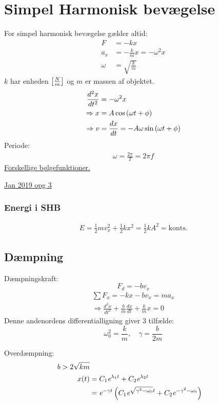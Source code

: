 \documentclass[a4paper,oneside,article]{memoir}
\begin{document}
\section{Simpel Harmonisk bevægelse} \label{sc:SHB}
For simpel harmonisk bevægelse gælder altid: 
\begin{align*}
	F &= -kx \\
    a_x &= -\frac{k}{m}x= -\omega^2x \\
    \omega &= \sqrt{\frac{k}{m}}
\end{align*}
$k$ har enheden $\br[2]{\frac{N}{m}}$ og $m$ er massen af objektet. 
\begin{align*}
    \frac{d^2x}{dt^2} &= -\omega^2x \\
    \Rightarrow x &= A\cos\br{\omega t+\phi} \\
    \Rightarrow v &= \frac{dx}{dt} = -A\omega\sin\br{\omega t +\phi} 
\end{align*}
Periode: 
\begin{align*}
    \omega = \frac{2\pi}{T} = 2\pi f
\end{align*}
\hyperref[fig:SHBbølgefunktioner]{Forskellige bølgefunktioner.}

\hyperref[asc:Jan 2019 opg 3]{Jan 2019 opg 3}

\subsubsection{Energi i SHB}
\begin{align*}
    E = \frac{1}{2}mv_x^2+\frac{1}{2}kx^2=\frac{1}{2}kA^2 = \text{konts.}
\end{align*}

\subsection{Dæmpning} \label{ssc:dæmpning}
Dæmpningskraft: \[F_d=-bv_x\]
\begin{align*}
    \sum F_x = -kx-bv_x = ma_x \\
    \Rightarrow \frac{d^2x}{dt^2}+\frac{b}{m}\frac{dx}{dt}+\frac{k}{m}x=0
\end{align*}
Denne andenordens differentialligning giver 3 tilfælde: 
\[\omega_0^2=\frac{k}{m},\quad \gamma=\frac{b}{2m}\]

Overdæmpning: 
\begin{align*}
    b > 2\sqrt{km} \\
    x(t) &= C_1\e{\lambda_1t}+C_2\e{\lambda_2t} \\
    &= \e{-\gamma t}\br{C_1\e{\sqrt{\gamma^2-\omega_0}t}+C_2\e{-\gamma^2-\omega_0}}
\end{align*}
\end{document}
